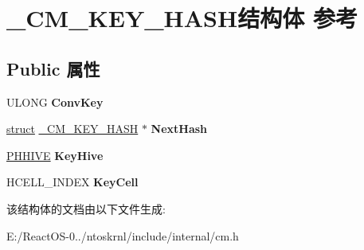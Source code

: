 \hypertarget{struct___c_m___k_e_y___h_a_s_h}{}\section{\+\_\+\+C\+M\+\_\+\+K\+E\+Y\+\_\+\+H\+A\+S\+H结构体 参考}
\label{struct___c_m___k_e_y___h_a_s_h}
\subsection*{Public 属性}
\begin{DoxyCompactItemize}
\item 
\mbox{\label{struct___c_m___k_e_y___h_a_s_h_a0a125676e15bc2ddf8348913d79ae3b1}} 
U\+L\+O\+NG {\bfseries Conv\+Key}
\item 
\mbox{\label{struct___c_m___k_e_y___h_a_s_h_af821f121e649af9251f9ba18c4863ebb}} 
\hyperlink{interfacestruct}{struct} \hyperlink{struct___c_m___k_e_y___h_a_s_h}{\+\_\+\+C\+M\+\_\+\+K\+E\+Y\+\_\+\+H\+A\+SH} $\ast$ {\bfseries Next\+Hash}
\item 
\mbox{\label{struct___c_m___k_e_y___h_a_s_h_a1f269e815a3542f1f53fb1fe362daf7d}} 
\hyperlink{struct___h_h_i_v_e}{P\+H\+H\+I\+VE} {\bfseries Key\+Hive}
\item 
\mbox{\label{struct___c_m___k_e_y___h_a_s_h_aeb27fa4e9c44cd7d2f8efe79c3af90c6}} 
H\+C\+E\+L\+L\+\_\+\+I\+N\+D\+EX {\bfseries Key\+Cell}
\end{DoxyCompactItemize}


该结构体的文档由以下文件生成\+:\begin{DoxyCompactItemize}
\item 
E\+:/\+React\+O\+S-\/0../ntoskrnl/include/internal/cm.\+h\end{DoxyCompactItemize}
